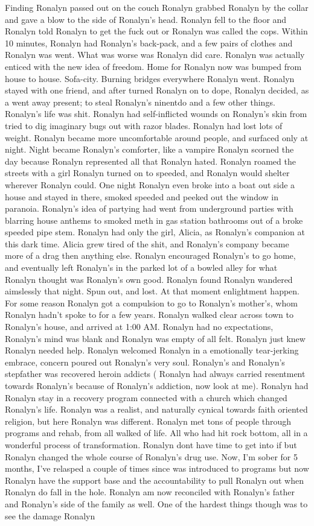 \documentclass[12pt]{book}
\begin{document}
Finding Ronalyn passed out on the couch Ronalyn grabbed Ronalyn by the collar and gave a blow to the side of Ronalyn's head. Ronalyn fell to the floor and Ronalyn told Ronalyn to get the fuck out or Ronalyn was called the cops. Within 10 minutes, Ronalyn had Ronalyn's back-pack, and a few pairs of clothes and Ronalyn was went. What was worse was Ronalyn did care. Ronalyn was actually enticed with the new idea of freedom. Home for Ronalyn now was bumped from house to house. Sofa-city. Burning bridges everywhere Ronalyn went. Ronalyn stayed with one friend, and after turned Ronalyn on to dope, Ronalyn decided, as a went away present; to steal Ronalyn's ninentdo and a few other things. Ronalyn's life was shit. Ronalyn had self-inflicted wounds on Ronalyn's skin from tried to dig imaginary bugs out with razor blades. Ronalyn had lost lots of weight. Ronalyn became more uncomfortable around people, and surfaced only at night. Night became Ronalyn's comforter, like a vampire Ronalyn scorned the day because Ronalyn represented all that Ronalyn hated. Ronalyn roamed the streets with a girl Ronalyn turned on to speeded, and Ronalyn would shelter wherever Ronalyn could. One night Ronalyn even broke into a boat out side a house and stayed in there, smoked speeded and peeked out the window in paranoia. Ronalyn's idea of partying had went from underground parties with blarring house anthems to smoked meth in gas station bathrooms out of a broke speeded pipe stem. Ronalyn had only the girl, Alicia, as Ronalyn's companion at this dark time. Alicia grew tired of the shit, and Ronalyn's company became more of a drag then anything else. Ronalyn encouraged Ronalyn's to go home, and eventually left Ronalyn's in the parked lot of a bowled alley for what Ronalyn thought was Ronalyn's own good. Ronalyn found Ronalyn wandered aimslessly that night. Spun out, and lost. At that moment enlightment happen. For some reason Ronalyn got a compulsion to go to Ronalyn's mother's, whom Ronalyn hadn't spoke to for a few years. Ronalyn walked clear across town to Ronalyn's house, and arrived at 1:00 AM. Ronalyn had no expectations, Ronalyn's mind was blank and Ronalyn was empty of all felt. Ronalyn just knew Ronalyn needed help. Ronalyn welcomed Ronalyn in a emotionally tear-jerking embrace, concern poured out Ronalyn's very soul. Ronalyn's and Ronalyn's stepfather was recovered heroin addicts ( Ronalyn had always carried resentment towards Ronalyn's because of Ronalyn's addiction, now look at me). Ronalyn had Ronalyn stay in a recovery program connected with a church which changed Ronalyn's life. Ronalyn was a realist, and naturally cynical towards faith oriented religion, but here Ronalyn was different. Ronalyn met tons of people through programs and rehab, from all walked of life. All who had hit rock bottom, all in a wonderful process of transformation. Ronalyn dont have time to get into if but Ronalyn changed the whole course of Ronalyn's drug use. Now, I'm sober for 5 months, I've relasped a couple of times since was introduced to programs but now Ronalyn have the support base and the accountability to pull Ronalyn out when Ronalyn do fall in the hole. Ronalyn am now reconciled with Ronalyn's father and Ronalyn's side of the family as well. One of the hardest things though was to see the damage Ronalyn 
\end{document}
